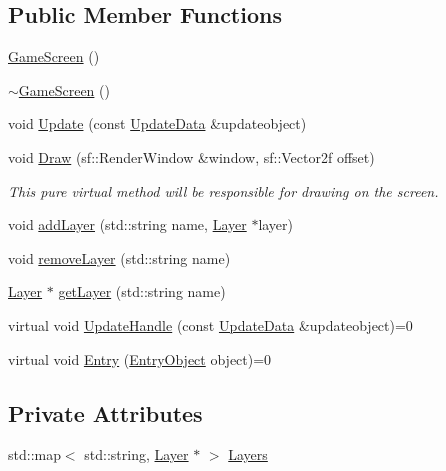 \subsection*{Public Member Functions}
\begin{DoxyCompactItemize}
\item 
\hyperlink{class_game_screen_ae68a867285e0aba9d2b22bff690616ac}{Game\-Screen} ()
\item 
\hyperlink{class_game_screen_a0d25dfce42d72954aab40dbccbf1a0b1}{$\sim$\-Game\-Screen} ()
\item 
void \hyperlink{class_game_screen_ad85617e2d9232b03a9a0149a9e6d43ce}{Update} (const \hyperlink{class_update_data}{Update\-Data} \&updateobject)
\item 
void \hyperlink{class_game_screen_afb11360ac509f47ca47929c254a8b67d}{Draw} (sf\-::\-Render\-Window \&window, sf\-::\-Vector2f offset)
\begin{DoxyCompactList}\small\item\em This pure virtual method will be responsible for drawing on the screen. \end{DoxyCompactList}\item 
void \hyperlink{class_game_screen_a14685a397e9c9c0ec971f648eeb1ec8b}{add\-Layer} (std\-::string name, \hyperlink{class_layer}{Layer} $\ast$layer)
\item 
void \hyperlink{class_game_screen_ace7d3aad324a781cd22599b56903fb43}{remove\-Layer} (std\-::string name)
\item 
\hyperlink{class_layer}{Layer} $\ast$ \hyperlink{class_game_screen_accd7cd68d80fc29593703ee1741b8996}{get\-Layer} (std\-::string name)
\item 
virtual void \hyperlink{class_game_screen_a5ffce37600960d6c8885bf071461998c}{Update\-Handle} (const \hyperlink{class_update_data}{Update\-Data} \&updateobject)=0
\item 
virtual void \hyperlink{class_game_screen_a76e44a105b36f32b68a0ba7a325971b0}{Entry} (\hyperlink{class_entry_object}{Entry\-Object} object)=0
\end{DoxyCompactItemize}
\subsection*{Private Attributes}
\begin{DoxyCompactItemize}
\item 
std\-::map$<$ std\-::string, \hyperlink{class_layer}{Layer} $\ast$ $>$ \hyperlink{class_game_screen_ab134d175092c247558838f11d66e9493}{Layers}
\end{DoxyCompactItemize}



